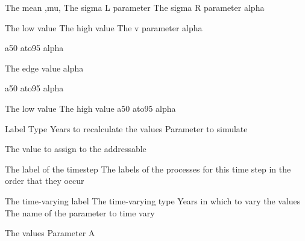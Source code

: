  {The mean ,mu,}
 {The sigma L parameter}
 {The sigma R parameter}
 {alpha}
\par\textbf{}\par
{} {The low value}
 {The high value}
 {The v parameter}
 {alpha}
\par\textbf{}\par
{} {a50}
 {ato95}
 {alpha}
\par\textbf{}\par
{} {The edge value}
 {alpha}
\par\textbf{}\par
{} {a50}
 {ato95}
 {alpha}
\par\textbf{}\par
{} {The low value}
 {The high value}
 {a50}
 {ato95}
 {alpha}
\par\par
{} {Label}
 {Type}
 {Years to recalculate the values}
 {Parameter to simulate}
\par\textbf{}\par
{} {The value to assign to the addressable}
\par\par
{} {The label of the timestep}
 {The labels of the processes for this time step in the order that they occur}
\par\par
{} {The time-varying label}
 {The time-varying type}
 {Years in which to vary the values}
 {The name of the parameter to time vary}
\par\textbf{}\par
{} {The values}
 {Parameter A}
